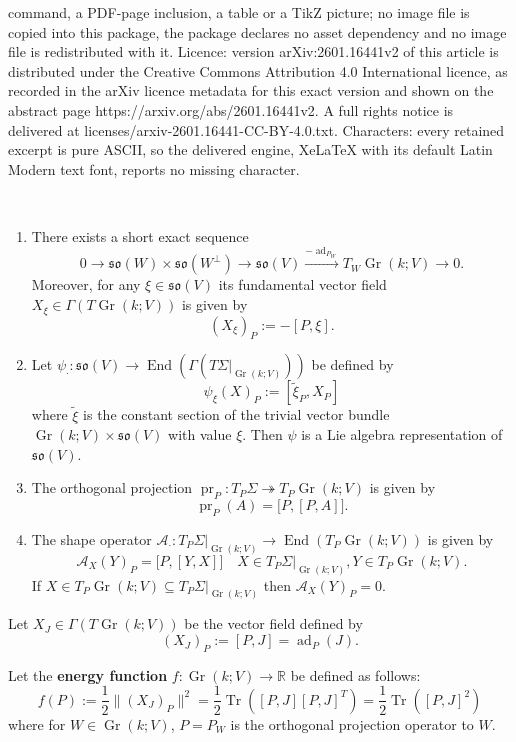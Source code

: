 \documentclass[10pt,a4paper]{amsart}
\def\A{\mathcal{A}}
\def\End{\operatorname{End}}
\def\Gr{\operatorname{Gr}}
\def\R{\mathbb{R}}
\def\Tr{\operatorname{Tr}}
\def\ad{\operatorname{ad}}
\def\pr{\operatorname{pr}}
\def\so{\mathfrak{so}}
\begin{document}
command, a PDF-page inclusion, a table or a TikZ picture; no image file is copied into this package, the package declares no asset dependency and no image file is redistributed with it. Licence: version arXiv:2601.16441v2 of this article is distributed under the Creative Commons Attribution 4.0 International licence, as recorded in the arXiv licence metadata for this exact version and shown on the abstract page https://arxiv.org/abs/2601.16441v2. A full rights notice is delivered at licenses/arxiv-2601.16441-CC-BY-4.0.txt. Characters: every retained excerpt is pure ASCII, so the delivered engine, XeLaTeX with its default Latin Modern text font, reports no missing character.
\begin{lemma}\label{lem:commutators}\
    \begin{enumerate}
        \item There exists a short exact sequence
        \[ 0 \to \so(W) \times \so(W^\perp) \to \so(V) \xrightarrow{-\ad_{P_W}} T_{W}\Gr(k; V) \to 0.\]
        Moreover, for any $\xi \in \so(V)$ its fundamental vector field $X_\xi \in \Gamma (T\Gr(k; V))$ is given by
        \[ (X_\xi)_P:= -[P, \xi].\]
        \item Let $\psi_\cdot : \so(V) \to \End (\Gamma(T\Sigma|_{\Gr(k; V)}))$ be defined by
        \[ \psi_\xi(X)_P:= [\widetilde{\xi}_P, X_P]\]
        where $\widetilde{\xi}$ is the constant section of the trivial vector bundle $\Gr(k; V) \times \so(V)$ with value $\xi$. Then $\psi$ is a Lie algebra representation of $\so(V)$.
         \item The orthogonal projection $\pr_P: T_P\Sigma\twoheadrightarrow T_P\Gr(k; V)$ is given by
        \[ \pr_P(A) = \big[P, [P, A]\big].\]
        \item The shape operator $\A_\cdot: T_P\Sigma|_{\Gr(k; V)} \to \End(T_P\Gr(k; V))$ is given by
        \[ \A_X (Y)_P = \big[P, [Y, X]\big] \quad X \in T_P\Sigma|_{\Gr(k; V)}, Y \in T_P\Gr(k; V).\]
        If $X \in T_P \Gr(k; V) \subseteq T_P\Sigma|_{\Gr(k; V)}$ then $\A_X(Y)_P = 0$.
       
    \end{enumerate}
\end{lemma}

\begin{definition} \label{def:energy}
Let $X_J \in \Gamma(T\Gr(k; V))$ be the vector field defined by
\[ (X_J)_P:= [P, J] = \ad_{P}(J).\]

Let the \textbf{energy function} $f: \Gr(k; V) \to \R$ be defined as follows:
\[
f(P) := \frac{1}{2} \lVert (X_J)_P \rVert^2 = \frac{1}{2} \Tr\left( [P, J] [P, J]^T \right) = \frac{1}{2} \Tr([P, J]^2)
\]
where for $W \in \Gr(k; V)$, $P = P_W$ is the orthogonal projection  operator to $W$.
\end{definition}
\end{document}
